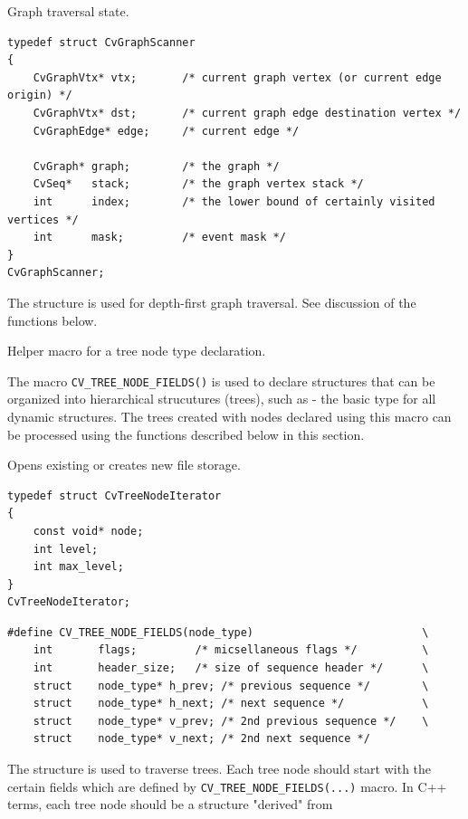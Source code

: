 \label{CvGraphScanner}
Graph traversal state.

\begin{lstlisting}
typedef struct CvGraphScanner
{
    CvGraphVtx* vtx;       /* current graph vertex (or current edge origin) */
    CvGraphVtx* dst;       /* current graph edge destination vertex */
    CvGraphEdge* edge;     /* current edge */

    CvGraph* graph;        /* the graph */
    CvSeq*   stack;        /* the graph vertex stack */
    int      index;        /* the lower bound of certainly visited vertices */
    int      mask;         /* event mask */
}
CvGraphScanner;

\end{lstlisting}

The structure  is used for depth-first graph traversal. See discussion of the functions below.

\label{CV_TREE_NODE_FIELDS}
Helper macro for a tree node type declaration.

The macro \texttt{CV\_TREE\_NODE\_FIELDS()} is used to declare structures
that can be organized into hierarchical strucutures (trees), such as
 - the basic type for all dynamic structures. The trees
created with nodes declared using this macro can be processed using the
functions described below in this section.

\label{CvTreeNodeIterator}
Opens existing or creates new file storage.

\begin{lstlisting}
typedef struct CvTreeNodeIterator
{
    const void* node;
    int level;
    int max_level;
}
CvTreeNodeIterator;
\end{lstlisting}

\begin{lstlisting}
#define CV_TREE_NODE_FIELDS(node_type)                          \
    int       flags;         /* micsellaneous flags */          \
    int       header_size;   /* size of sequence header */      \
    struct    node_type* h_prev; /* previous sequence */        \
    struct    node_type* h_next; /* next sequence */            \
    struct    node_type* v_prev; /* 2nd previous sequence */    \
    struct    node_type* v_next; /* 2nd next sequence */

\end{lstlisting}

The structure \cross{CvTreeNodeIterator} is used to traverse trees. Each tree node should start with the certain fields which are defined by \texttt{CV\_TREE\_NODE\_FIELDS(...)} macro. In C++ terms, each tree node should be a structure "derived" from

